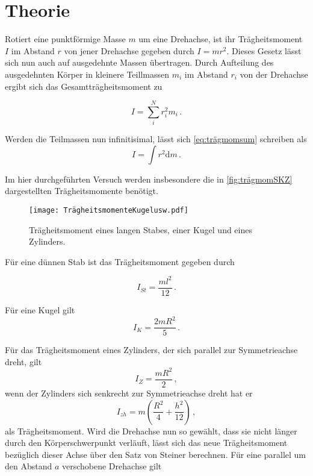 \section{Theorie}
\label{sec:Theorie}
Rotiert eine punktförmige Masse $m$ um eine Drehachse, ist ihr Trägheitsmoment $I$ im Abstand $r$ von jener Drehachse gegeben durch $I = m r^2$.
Dieses Gesetz lässt sich nun auch auf ausgedehnte Massen übertragen. Durch Aufteilung des ausgedehnten Körper in kleinere Teillmassen $m_i$ im Abstand $r_i$ von der Drehachse ergibt sich
das Gesamtträgheitsmoment zu

\begin{equation}
    I = \sum_i^N r^2_i m_i\,.
    \label{eq:trägmomsum}
\end{equation}

Werden die Teilmassen nun infinitisimal, lässt sich \eqref{eq:trägmomsum} schreiben als
\begin{equation}
    I = \int r^2 \mathrm{d}m\,.
    \label{eq:trägmomint}
\end{equation}

Im hier durchgeführten Versuch werden insbesondere die in \autoref{fig:trägmomSKZ} dargestellten Trägheitsmomente benötigt.

\begin{figure}
    \centering
    \texttt{[image: TrägheitsmomenteKugelusw.pdf]}
    \caption{Trägheitsmoment eines langen Stabes, einer Kugel und eines Zylinders\cite{ap05}.}
    \label{fig:trägmomSKZ}
\end{figure}
Für eine dünnen Stab ist das Trägheitsmoment gegeben durch 

\begin{equation}
    I_{St} = \dfrac{m l^2}{12} \,.
    \label{eq:trägdünstab}
\end{equation}

Für eine Kugel gilt
\begin{equation}
    I_{K} = \dfrac{2 m R^2}{5} \,.
    \label{eq:trägKugel}
\end{equation}

Für das Trägheitsmoment eines Zylinders, der sich parallel zur Symmetrieachse dreht, gilt
\begin{equation}
    I_{Z} = \dfrac{m R^2}{2} \,,
    \label{eq:trägZylinderparall}
\end{equation}
wenn der Zylinders sich senkrecht zur Symmetrieachse dreht hat er 
\begin{equation}
    I_{zh} = m (\dfrac{R^2}{4} + \dfrac{h^2}{12}) \,,
    \label{eq:trägZylindersenkrecht}
\end{equation}
als Trägheitsmoment.
Wird die Drehachse nun so gewählt, dass sie nicht länger durch den Körperschwerpunkt verläuft, lässt sich das neue Trägheitsmoment bezüglich dieser Achse über den Satz von Steiner berechnen.
Für eine parallel um den Abstand $a$ verschobene Drehachse gilt

